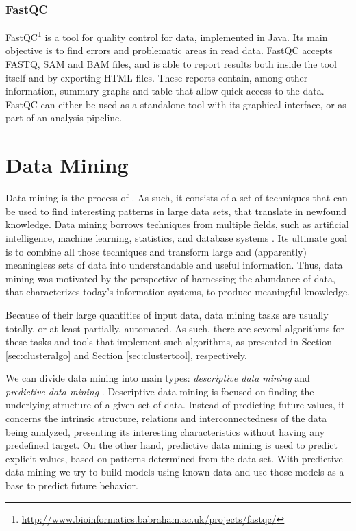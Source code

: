 \subsubsection*{FastQC}

FastQC\footnote{\url{http://www.bioinformatics.babraham.ac.uk/projects/fastqc/}}
is a tool for quality control for \ngs{} data, implemented in Java. Its main
objective is to find errors and problematic areas in \ngs{} read data. FastQC
accepts FASTQ, SAM and BAM files, and is able to report results both inside the
tool itself and by exporting HTML files. These reports contain, among other
information, summary graphs and table that allow quick access to the data.
FastQC can either be used as a standalone tool with its graphical interface, or
as part of an analysis pipeline.

\section{Data Mining}\label{sec:mlearning}


Data mining is the process of  \cite[p. 5]{han2006data}. As such, it consists of a
set of techniques that can be used to find interesting patterns in large data
sets, that translate in newfound knowledge. Data mining borrows techniques from
multiple fields, such as artificial intelligence, machine learning, statistics,
and database systems \cite{Chakrabarti2012}. Its ultimate goal is to combine all
those techniques and transform large and (apparently) meaningless sets of data
into understandable and useful information. Thus, data mining was motivated by
the perspective of harnessing the abundance of data, that characterizes today's
information systems, to produce meaningful knowledge.

Because of their large quantities of input data, data mining tasks are usually
totally, or at least partially, automated. As such, there are several algorithms
for these tasks and tools that implement such algorithms, as presented in
Section \ref{sec:clusteralgo} and Section \ref{sec:clustertool}, respectively.

We can divide data mining into main types: \emph{descriptive data mining} and
\emph{predictive data mining} \cite{Fayyad1996}. Descriptive data mining is
focused on finding the underlying structure of a given set of data. Instead of
predicting future values, it concerns the intrinsic structure, relations and
interconnectedness of the data being analyzed, presenting its interesting
characteristics without having any predefined target. On the other hand,
predictive data mining is used to predict explicit values, based on patterns
determined from the data set. With predictive data mining we try to build models
using known data and use those models as a base to predict future behavior.

